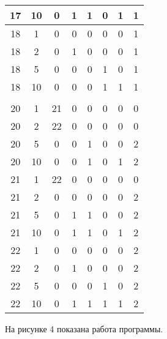\begin{longtable}[c]{|c|c|c|c|c|c|c|c|}
17    & 10     & 0         & 1        & 1        & 0          & 1        & 1    \\ \hline
18    & 1      & 0         & 0        & 0        & 0          & 0        & 1    \\ \hline
18    & 2      & 0         & 1        & 0        & 0          & 0        & 1    \\ \hline
18    & 5      & 0         & 0        & 0        & 1          & 0        & 1    \\ \hline
18    & 10     & 0         & 0        & 0        & 1          & 1        & 1    \\ \hline
        &        &           &          &          &            &          &      \\ \hline
20    & 1      & 21        & 0        & 0        & 0          & 0        & 0    \\ \hline
20    & 2      & 22        & 0        & 0        & 0          & 0        & 0    \\ \hline
20    & 5      & 0         & 0        & 1        & 0          & 0        & 2    \\ \hline
20    & 10     & 0         & 0        & 1        & 0          & 1        & 2    \\ \hline
21    & 1      & 22        & 0        & 0        & 0          & 0        & 0    \\ \hline
21    & 2      & 0         & 0        & 0        & 0          & 0        & 2    \\ \hline
21    & 5      & 0         & 1        & 1        & 0          & 0        & 2    \\ \hline
21    & 10     & 0         & 1        & 1        & 0          & 1        & 2    \\ \hline
22    & 1      & 0         & 0        & 0        & 0          & 0        & 2    \\ \hline
22    & 2      & 0         & 1        & 0        & 0          & 0        & 2    \\ \hline
22    & 5      & 0         & 0        & 0        & 1          & 0        & 2    \\ \hline
22    & 10     & 0         & 1        & 1        & 1          & 1        & 2    \\ \hline
\end{longtable}
\endgroup
\FloatBarrier

На рисунке 4 показана работа программы.

\FloatBarrier

